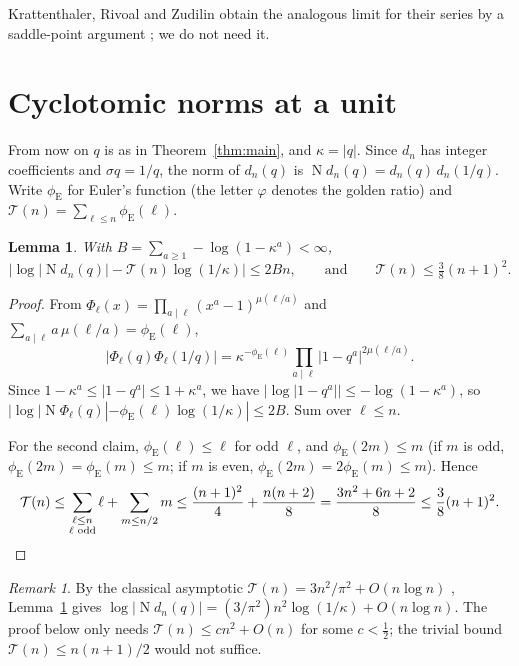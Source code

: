 \documentclass[11pt]{amsart}
\newtheorem{lemma}[theorem]{Lemma}
\theoremstyle{definition}
\theoremstyle{remark}
\newtheorem{remark}[theorem]{Remark}
\numberwithin{equation}{section}
\newcommand{\Nm}{\operatorname{N}}
\newcommand{\eu}{\phi_{\mathrm E}}
\newcommand{\Tot}{\mathcal T}
\begin{document}
Krattenthaler, Rivoal and Zudilin obtain the analogous limit for their series by a saddle-point argument
\cite{KRZ06}; we do not need it.

\section{Cyclotomic norms at a unit}\label{sec:cost}

From now on $q$ is as in Theorem~\ref{thm:main}, and $\kappa=|q|$. Since $d_n$ has integer coefficients and
$\sigma q=1/q$, the norm of $d_n(q)$ is $\Nm d_n(q)=d_n(q)\,d_n(1/q)$. Write $\eu$ for Euler's function (the letter $\varphi$ denotes the golden ratio) and
$\Tot(n)=\sum_{\ell\le n}\eu(\ell)$.

\begin{lemma}\label{lem:cost}
With $B=\sum_{a\ge1}-\log(1-\kappa^a)<\infty$,
\[
\bigl|\log|\Nm d_n(q)|-\Tot(n)\log(1/\kappa)\bigr|\le2Bn,\qquad\text{and}\qquad\Tot(n)\le\tfrac38(n+1)^2.
\]
\end{lemma}

\begin{proof}
From $\Phi_\ell(x)=\prod_{a\mid\ell}(x^a-1)^{\mu(\ell/a)}$ and $\sum_{a\mid\ell}a\,\mu(\ell/a)=\eu(\ell)$,
\[
|\Phi_\ell(q)\Phi_\ell(1/q)|=\kappa^{-\eu(\ell)}\prod_{a\mid\ell}|1-q^a|^{2\mu(\ell/a)}.
\]
Since $1-\kappa^a\le|1-q^a|\le1+\kappa^a$, we have $|\log|1-q^a||\le-\log(1-\kappa^a)$, so
$|\log|\Nm\Phi_\ell(q)|-\eu(\ell)\log(1/\kappa)|\le2B$. Sum over $\ell\le n$.

For the second claim, $\eu(\ell)\le\ell$ for odd $\ell$, and $\eu(2m)\le m$ (if $m$ is odd, $\eu(2m)=\eu(m)\le m$; if
$m$ is even, $\eu(2m)=2\eu(m)\le m$). Hence
\[
\Tot(n)\le\sum_{\substack{\ell\le n\\ \ell\text{ odd}}}\ell+\sum_{m\le n/2}m\le\frac{(n+1)^2}4+\frac{n(n+2)}8
=\frac{3n^2+6n+2}8\le\frac38(n+1)^2.\qedhere
\]
\end{proof}

\begin{remark}\label{rem:mertens}
By the classical asymptotic $\Tot(n)=3n^2/\pi^2+O(n\log n)$ \cite[Theorem~330]{HW08}, Lemma~\ref{lem:cost} gives
$\log|\Nm d_n(q)|=(3/\pi^2)n^2\log(1/\kappa)+O(n\log n)$. The proof below only needs $\Tot(n)\le cn^2+O(n)$ for some
$c<\frac12$; the trivial bound $\Tot(n)\le n(n+1)/2$ would not suffice.
\end{remark}
\end{document}
